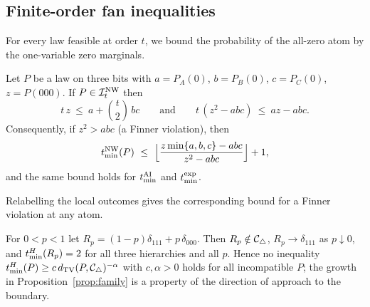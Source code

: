 \subsection{Finite-order fan inequalities}\label{sec:fan}

For every law feasible at order $t$, we bound the probability of the all-zero atom by the one-variable zero marginals.

\begin{theorem}\label{thm:fan}
Let $P$ be a law on three bits with $a=P_A(0)$, $b=P_B(0)$, $c=P_C(0)$, $z=P(000)$. If $P\in\mathcal I^{\mathrm{NW}}_t$ then
\begin{equation}\label{eq:fan}
t\,z\ \le\ a+\binom t2\,bc
\qquad\text{and}\qquad
t\,(z^2-abc)\ \le\ az-abc .
\end{equation}
Consequently, if $z^2>abc$ (a Finner violation), then
\begin{equation}\label{eq:fan-order}
\tmin^{\mathrm{NW}}(P)\ \le\ \Bigl\lfloor\frac{z\min\{a,b,c\}-abc}{z^2-abc}\Bigr\rfloor+1 ,
\end{equation}
and the same bound holds for $t_{\min}^{\mathrm{AI}}$ and $t_{\min}^{\mathrm{exp}}$.
\end{theorem}

Relabelling the local outcomes gives the corresponding bound for a Finner violation at any atom.



\begin{proposition}\label{prop:Rp}
For $0<p<1$ let $R_p=(1-p)\delta_{111}+p\,\delta_{000}$. Then $R_p\notin\mathcal C_{\triangle}$, $R_p\to\delta_{111}$ as $p\downarrow0$, and $t_{\min}^H(R_p)=2$ for all three hierarchies and all $p$. Hence no inequality $t_{\min}^H(P)\ge c\,d_{\operatorname{TV}}(P,\mathcal C_{\triangle})^{-\alpha}$ with $c,\alpha>0$ holds for all incompatible $P$; the growth in Proposition~\ref{prop:family} is a property of the direction of approach to the boundary.
\end{proposition}



